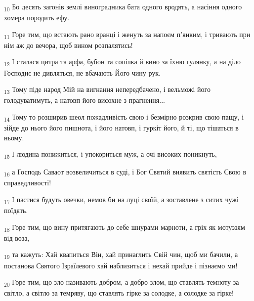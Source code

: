 \begin{tcolorbox}
\textsubscript{10} Бо десять загонів землі виноградника бата одного вродять, а насіння одного хомера породить ефу.
\end{tcolorbox}
\begin{tcolorbox}
\textsubscript{11} Горе тим, що встають рано вранці і женуть за напоєм п'янким, і тривають при нім аж до вечора, щоб вином розпалятись!
\end{tcolorbox}
\begin{tcolorbox}
\textsubscript{12} І сталася цитра та арфа, бубон та сопілка й вино за їхню гулянку, а на діло Господнє не дивляться, не вбачають Його чину рук.
\end{tcolorbox}
\begin{tcolorbox}
\textsubscript{13} Тому піде народ Мій на вигнання непередбачено, і вельможі його голодуватимуть, а натовп його висохне з прагнення...
\end{tcolorbox}
\begin{tcolorbox}
\textsubscript{14} Тому то розширив шеол пожадливість свою і безмірно розкрив свою пащу, і зійде до нього його пишнота, і його натовп, і гуркіт його, й ті, що тішаться в ньому.
\end{tcolorbox}
\begin{tcolorbox}
\textsubscript{15} І людина понижиться, і упокориться муж, а очі високих поникнуть,
\end{tcolorbox}
\begin{tcolorbox}
\textsubscript{16} а Господь Саваот возвеличиться в суді, і Бог Святий виявить святість Свою в справедливості!
\end{tcolorbox}
\begin{tcolorbox}
\textsubscript{17} І пастися будуть овечки, немов би на луці своїй, а зоставлене з ситих чужі поїдять.
\end{tcolorbox}
\begin{tcolorbox}
\textsubscript{18} Горе тим, що вину притягають до себе шнурами марноти, а гріх як мотуззям від воза,
\end{tcolorbox}
\begin{tcolorbox}
\textsubscript{19} та кажуть: Хай квапиться Він, хай принаглить Свій чин, щоб ми бачили, а постанова Святого Ізраїлевого хай наблизиться і нехай прийде і пізнаємо ми!
\end{tcolorbox}
\begin{tcolorbox}
\textsubscript{20} Горе тим, що зло називають добром, а добро злом, що ставлять темноту за світло, а світло за темряву, що ставлять гірке за солодке, а солодке за гірке!
\end{tcolorbox}
